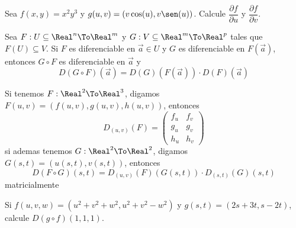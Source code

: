 \begin{frame}
  \begin{eg}
    Sea $f(x,y)=x^2y^3$ y $g(u,v)=(v\cos(u),v\sen(u))$. Calcule $\dfrac{\partial f}{\partial u}$ y $\dfrac{\partial f}{\partial v}$.
  \end{eg}
\end{frame}

\begin{frame}
  \begin{thm}
    Sea $F:U\subseteq\Real^n\To\Real^m$ y $G:V\subseteq\Real^m\To\Real^p$ tales que $F(U)\subseteq V$. Si $F$ es diferenciable en $\vec{a}\in U$ y $G$ es diferenciable en $F(\vec{a})$, entonces $G\circ F$ es diferenciable en $\vec{a}$ y
    $$D(G\circ F)(\vec{a})=D(G)(F(\vec{a}))\cdot D(F)(\vec{a})$$
  \end{thm}
\end{frame}

\begin{frame}
  \begin{rem}
    Si tenemos $F:\Real^2\To\Real^3$, digamos $F(u,v)=(f(u,v),g(u,v),h(u,v))$, entonces
    $$D_{(u,v)}(F)=\begin{pmatrix}
      f_u & f_v\\
      g_u & g_v\\
      h_u & h_v
    \end{pmatrix}$$
    si ademas tenemos $G:\Real^2\To\Real^2$, digamos $G(s,t)=(u(s,t),v(s,t))$, entonces
    $$D(F\circ G)(s,t)=D_{(u,v)}(F)(G(s,t))\cdot D_{(s,t)}(G)(s,t)$$
    matricialmente
  \end{rem}
\end{frame}

\begin{frame}
  \begin{eg}
    Si $f(u,v,w)=(u^2+v^2+w^2,u^2+v^2-w^2)$ y $g(s,t)=(2s+3t,s-2t)$, calcule $D(g\circ f)(1,1,1)$.
  \end{eg}
\end{frame}

